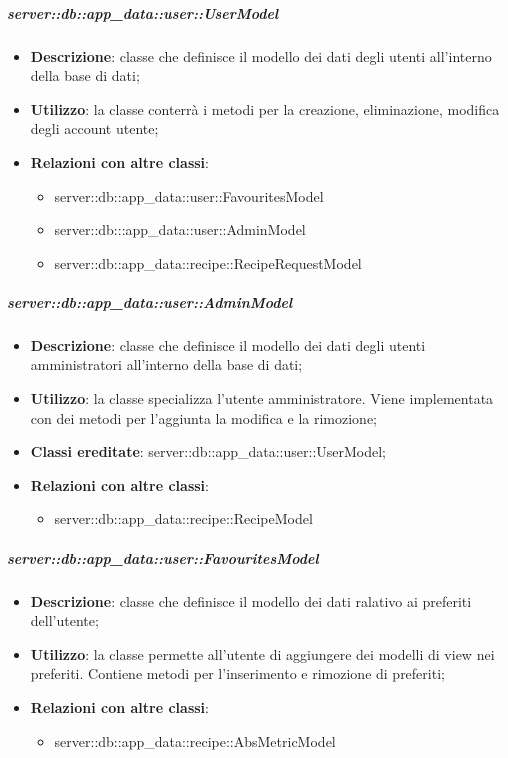 		\subparagraph{server::db::app\_data::user::UserModel} %
		\label{subp:server_db_app_data_user_user_model}
			\begin{itemize}
				\item \textbf{Descrizione}: classe che definisce il modello dei dati degli utenti all'interno della base di dati;
				\item \textbf{Utilizzo}: la classe conterrà i metodi per la creazione, eliminazione, modifica degli account utente;
				\item \textbf{Relazioni con altre classi}:
					\begin{itemize}
						\item server::db::app\_data::user::FavouritesModel
						\item server::db:::app\_data::user::AdminModel
						\item server::db::app\_data::recipe::RecipeRequestModel
					\end{itemize}
			\end{itemize}


		\subparagraph{server::db::app\_data::user::AdminModel} %
		\label{subp:server_db_app_data_user_admin_model}
			\begin{itemize}
				\item \textbf{Descrizione}: classe che definisce il modello dei dati degli utenti amministratori all'interno della base di dati;
				\item \textbf{Utilizzo}: la classe specializza l'utente amministratore. Viene implementata con dei metodi per l'aggiunta la modifica e la rimozione;
				\item \textbf{Classi ereditate}: server::db::app\_data::user::UserModel;
				\item \textbf{Relazioni con altre classi}:
					\begin{itemize}
						\item server::db::app\_data::recipe::RecipeModel
					\end{itemize}
			\end{itemize}


		\subparagraph{server::db::app\_data::user::FavouritesModel} %
		\label{subp:server_db_app_data_user_favorites}
			\begin{itemize}
				\item \textbf{Descrizione}: classe che definisce il modello dei dati ralativo ai preferiti dell'utente;
				\item \textbf{Utilizzo}: la classe  permette all'utente di aggiungere dei modelli di view nei preferiti. Contiene metodi per l'inserimento e rimozione di preferiti;
				\item \textbf{Relazioni con altre classi}:
					\begin{itemize}
						\item server::db::app\_data::recipe::AbsMetricModel
					\end{itemize}
			\end{itemize}


